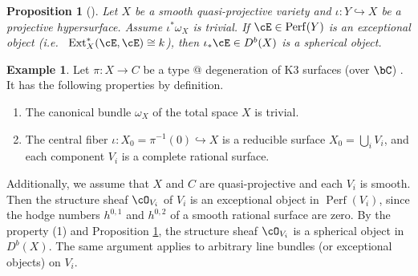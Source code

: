 \documentclass[12pt]{amsart}
\makeatletter
\numberwithin{equation}{section}
\theoremstyle{plain}
\newtheorem{proposition}[theorem]{Proposition}
\theoremstyle{definition}
\newtheorem{example}[theorem]{Example}
\DeclareMathOperator{\Perf}{\mathrm{Perf}}
\DeclareMathOperator{\Ext}{\mathrm{Ext}}
\newcommand*{\rom}[1]{\expandafter\@slowromancap\romannumeral #1@}
\makeatother
\begin{document}
\begin{proposition}[{\cite[Proposition 3.15]{MR1831820}}]\label{prop:exceptional-to-spherical}
    Let $X$ be a smooth quasi-projective variety and $\iota \colon Y \hookrightarrow X$ be a projective hypersurface.
    Assume $\iota^*\omega_X$ is trivial.
    If $\cE \in \Perf(Y)$ is an \emph{exceptional object} (i.e.~ $\Ext^*_X(\cE, \cE) \cong k$), then $\iota_* \cE \in D^b(X)$ is a spherical object.
\end{proposition}
\begin{example}\label{ex:spherical-object-from-K3-degeneration}
    Let $\pi \colon X \to C$ be a type \rom{3} degeneration of K3 surfaces (over $\bC$) \cite{Kulikov1977,Persson--Pinkham1981}.
    It has the following properties by definition.
    \begin{enumerate}
        \item The canonical bundle $\omega_X$ of the total space $X$ is trivial.
        \item The central fiber $\iota \colon X_0 = \pi^{-1}(0) \hookrightarrow X$ is a reducible surface $X_0 = \bigcup_i V_i$, and each component $V_i$ is a complete rational surface.
    \end{enumerate}
    Additionally, we assume that $X$ and $C$ are quasi-projective and each $V_i$ is smooth.
    Then the structure sheaf $\cO_{V_i}$ of $V_i$ is an exceptional object in $\Perf(V_i)$, since the hodge numbers $h^{0,1}$ and $h^{0,2}$ of a smooth rational surface are zero.
    By the property (1) and Proposition \ref{prop:exceptional-to-spherical}, the structure sheaf $\cO_{V_i}$ is a spherical object in $D^b(X)$.
    The same argument applies to arbitrary line bundles (or exceptional objects) on $V_i$.


\end{example}
\end{document}
